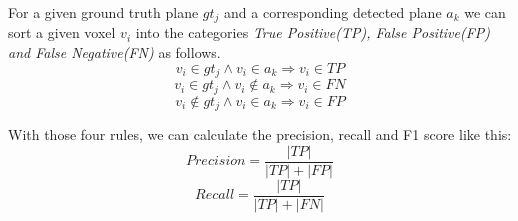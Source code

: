 \documentclass[main.tex]{subfiles}
\begin{document}
For a given ground truth plane $gt_j$ and a corresponding detected plane $a_k$ we can sort a given voxel $v_i$ into the categories
\textit{True Positive(TP), False Positive(FP) and False Negative(FN)} as follows.
$$v_i \in gt_j \land v_i \in a_k \Rightarrow v_{i} \in TP$$
$$v_i \in gt_j \land v_i \notin a_k \Rightarrow v_{i} \in FN$$
$$v_i \notin gt_j \land v_i \in a_k \Rightarrow v_{i} \in FP$$

With those four rules, we can calculate the precision, recall and F1 score like this:
$$Precision = \frac{|TP|}{|TP|+|FP|}$$
$$Recall = \frac{|TP|}{|TP|+|FN|}$$
\end{document}
